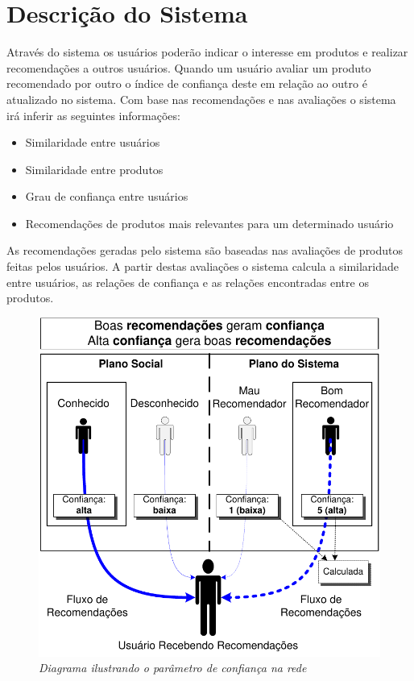 
\section{Descrição do Sistema}

 Através do sistema os usuários poderão indicar o interesse em produtos e realizar recomendações a outros usuários. Quando um usuário avaliar um produto recomendado por outro o índice de confiança deste em relação ao outro é atualizado no sistema. Com base nas recomendações e nas avaliações o sistema irá inferir as seguintes informações:
 
\begin{itemize}

 \item Similaridade entre usuários

 \item Similaridade entre produtos

 \item Grau de confiança entre usuários

 \item Recomendações de produtos mais relevantes para um determinado usuário

\end{itemize}

 As recomendações geradas pelo sistema são baseadas nas avaliações de produtos feitas pelos usuários. A partir destas avaliações o sistema calcula a similaridade entre usuários, as relações de confiança e as relações encontradas entre os produtos.

\begin{figure}[htp]
 \centering
 \includegraphics[width=\textwidth]{imagens/diagrama_confianca}
 \caption{\it Diagrama ilustrando o parâmetro de confiança na rede}
 \label{fig:diagrama_confianca}
\end{figure}
 
